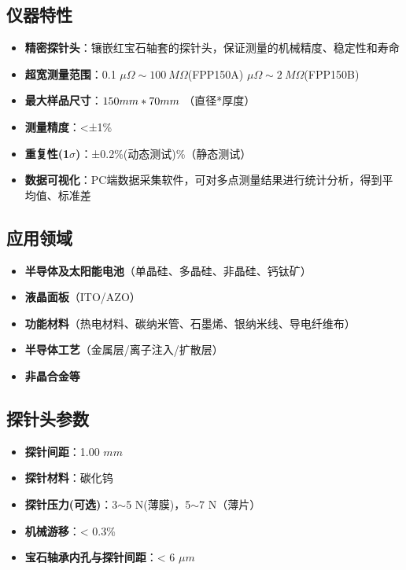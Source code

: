 \documentclass[12pt]{ctexart}
\begin{document}
\subsection{仪器特性}
\begin{itemize}
	\item \textbf{精密探针头}：镶嵌红宝石轴套的探针头，保证测量的机械精度、稳定性和寿命
	\item \textbf{超宽测量范围}：0.1 $\mu\Omega\sim 100\ M\Omega$(FPP150A) $\mu\Omega\sim 2\ M\Omega$(FPP150B)
	\item \textbf{最大样品尺寸}：$150\space mm*70\space mm$ （直径*厚度）
	\item \textbf{测量精度}：<±1\%
	\item \textbf{重复性(1$\sigma$)}：±0.2\%(动态测试)\%（静态测试）
	\item \textbf{数据可视化}：PC端数据采集软件，可对多点测量结果进行统计分析，得到平均值、标准差
	
    \end{itemize}
\subsection{应用领域}
    \begin{itemize}
    \item \textbf{半导体及太阳能电池}（单晶硅、多晶硅、非晶硅、钙钛矿）
    \item \textbf{液晶面板}（ITO/AZO）
    \item \textbf{功能材料}（热电材料、碳纳米管、石墨烯、银纳米线、导电纤维布）
    \item \textbf{半导体工艺}（金属层/离子注入/扩散层）
    \item \textbf{非晶合金等}
    \end{itemize}

\subsection{探针头参数}
\begin{itemize}
	\item \textbf{探针间距}：1.00 $mm$
	\item \textbf{探针材料}：碳化钨
	\item \textbf{探针压力(可选)}：3$\sim$5 N(薄膜)，5$\sim$7 N（薄片）
	\item \textbf{机械游移}：< 0.3\%
	\item \textbf{宝石轴承内孔与探针间距}：< 6 $\mu m$
\end{itemize}
\end{document}
